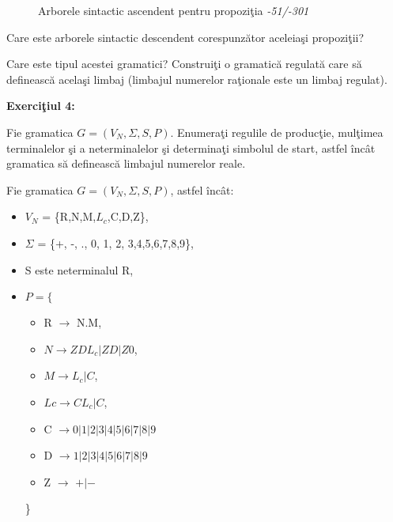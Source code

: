 \begin{figure}[H]
\centering
{}
\caption{Arborele sintactic ascendent pentru propoziţia \textit{-51/-301}}
\end{figure}

Care este arborele sintactic descendent corespunzător aceleiaşi propoziţii?

Care este tipul acestei gramatici? Construiţi o gramatică regulată care să definească acelaşi limbaj (limbajul numerelor raţionale este un limbaj regulat).

\textbf{Exerciţiul 4:}

Fie gramatica $G = (V_{N}, \Sigma, S, P)$. Enumeraţi regulile de producţie, mulţimea terminalelor şi a neterminalelor şi determinaţi simbolul de start, astfel încât gramatica să definească limbajul numerelor reale.

Fie gramatica $G = (V_{N}, \Sigma, S, P)$, astfel încât:

\begin{itemize}
\item
$V_{N}$ = \{R,N,M,$L_c$,C,D,Z\},
\item
$\Sigma$ = \{+, -, ., 0, 1, 2, 3,4,5,6,7,8,9\},
\item
S este neterminalul R,
\item
$P = \{$
\begin{itemize}
\item
R $\rightarrow$  N.M,
\item
$N \rightarrow ZDL_c | ZD | Z0$,
\item
$M \rightarrow L_c |C$,
\item
$Lc \rightarrow CL_c | C$,
\item
C $\rightarrow 0|1|2|3|4|5|6|7|8|9$
\item
D $\rightarrow 1|2|3|4|5|6|7|8|9$
\item
Z $\rightarrow$  $+|-$
\end{itemize}
\}
\end{itemize}

